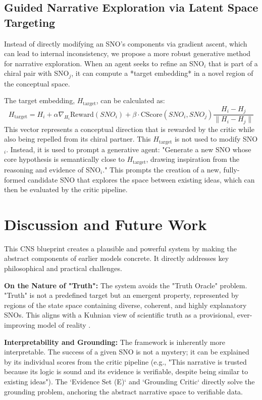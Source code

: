 \documentclass[12pt, a4paper]{article}
\begin{document}
\subsection{Guided Narrative Exploration via Latent Space Targeting}
Instead of directly modifying an SNO's components via gradient ascent, which can lead to internal inconsistency, we propose a more robust generative method for narrative exploration. When an agent seeks to refine an SNO$_i$ that is part of a chiral pair with SNO$_j$, it can compute a *target embedding* in a novel region of the conceptual space.

The target embedding, $H_{\text{target}}$, can be calculated as:
\begin{equation} \label{eq:crga_reworked}
H_{\text{target}} = H_{i} + \alpha \nabla_{H_i} \text{Reward}(SNO_i) + \beta \cdot \text{CScore}(SNO_i, SNO_j) \frac{H_{i} - H_{j}}{\|H_{i} - H_{j}\|}
\end{equation}
This vector represents a conceptual direction that is rewarded by the critic while also being repelled from its chiral partner. This $H_{\text{target}}$ is not used to modify SNO$_i$. Instead, it is used to prompt a generative agent: "Generate a new SNO whose core hypothesis is semantically close to $H_{\text{target}}$, drawing inspiration from the reasoning and evidence of SNO$_i$." This prompts the creation of a new, fully-formed candidate SNO that explores the space between existing ideas, which can then be evaluated by the critic pipeline.


\section{Discussion and Future Work}
This CNS blueprint creates a plausible and powerful system by making the abstract components of earlier models concrete. It directly addresses key philosophical and practical challenges.

\textbf{On the Nature of "Truth":} The system avoids the "Truth Oracle" problem. "Truth" is not a predefined target but an emergent property, represented by regions of the state space containing diverse, coherent, and highly explanatory SNOs. This aligns with a Kuhnian view of scientific truth as a provisional, ever-improving model of reality \citep{Kuhn1962}.

\textbf{Interpretability and Grounding:} The framework is inherently more interpretable. The success of a given SNO is not a mystery; it can be explained by its individual scores from the critic pipeline (e.g., "This narrative is trusted because its logic is sound and its evidence is verifiable, despite being similar to existing ideas"). The `Evidence Set (E)` and `Grounding Critic` directly solve the grounding problem, anchoring the abstract narrative space to verifiable data.
\end{document}
